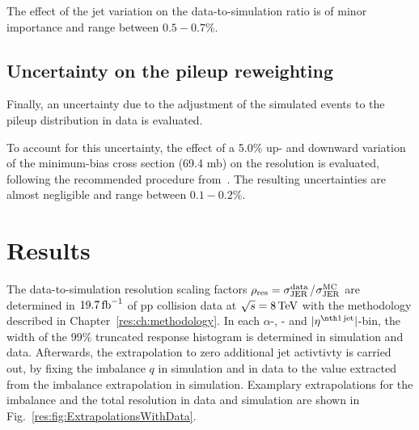 The effect of the jet \pt variation on the data-to-simulation ratio is of minor importance and range between $0.5-0.7\%$.


\section*{Uncertainty on the pileup reweighting}
Finally, an uncertainty due to the adjustment of the simulated events to the pileup distribution in data is evaluated.

To account for this uncertainty, the effect of a 5.0\% up- and downward variation of the minimum-bias cross section (69.4 mb) on the resolution is evaluated, following the recommended procedure from~\cite{bib:CMS:PileUpReweighting}.
The resulting uncertainties are almost negligible and range between $0.1-0.2\%$.

\FloatBarrier
\chapter{Results}
\label{res:ch:results}

The data-to-simulation resolution scaling factors $\rho_\mathrm{res} = \sigma_\mathrm{JER}^{\text{data}}$/$\sigma_\mathrm{JER}^{\text{MC}}$ are determined in $19.7\,\text{fb}^{-1}$ of pp collision data at $\sqrt{s} = 8 \,\text{Te}\kern-0.06667em\text{V}$ with the methodology described in Chapter~\ref{res:ch:methodology}.
In each $\alpha$-, \ptgamma- and $|\etafirstjet|$-bin, the width of the 99\% truncated response histogram is determined in simulation and data.
Afterwards, the extrapolation to zero additional jet activtivty is carried out, by fixing the imbalance $q$ in simulation and in data to the value extracted from the imbalance extrapolation in simulation.
Examplary extrapolations for the imbalance and the total resolution in data and simulation are shown in Fig.~\ref{res:fig:ExtrapolationsWithData}.

